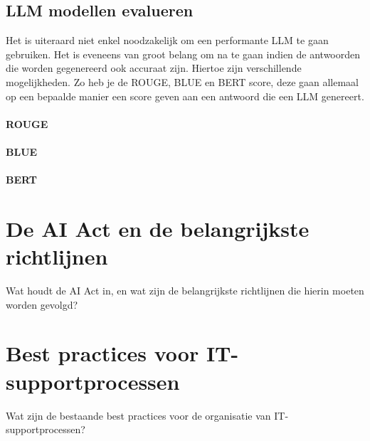     \subsection{LLM modellen evalueren}
    
    Het is uiteraard niet enkel noodzakelijk om een performante LLM te gaan gebruiken. Het is eveneens van groot belang om na te gaan indien de antwoorden die worden gegenereerd ook accuraat zijn. Hiertoe zijn verschillende mogelijkheden. Zo heb je de ROUGE, BLUE en BERT score, deze gaan allemaal op een bepaalde manier een score geven aan een antwoord die een LLM genereert.
    
    \paragraph{ROUGE}
    
    \paragraph{BLUE}
    
    \paragraph{BERT}

\section{De AI Act en de belangrijkste richtlijnen}
Wat houdt de AI Act in, en wat zijn de belangrijkste richtlijnen die hierin moeten worden gevolgd?

\section{Best practices voor IT-supportprocessen}
Wat zijn de bestaande best practices voor de organisatie van IT-supportprocessen?
